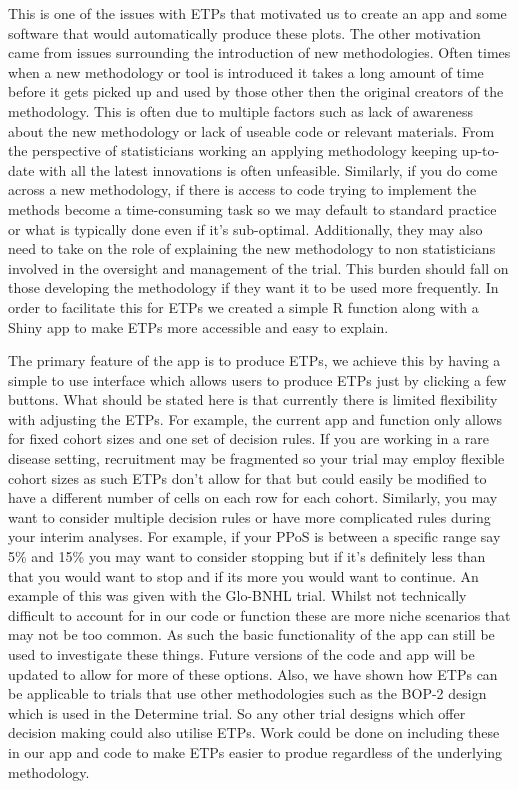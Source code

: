 This is one of the issues with ETPs that motivated us to create an app and some software that would automatically produce these plots. The other motivation came from issues surrounding the introduction of new methodologies. Often times when a new methodology or tool is introduced it takes a long amount of time before it gets picked up and used by those other then the original creators of the methodology. This is often due to multiple factors such as lack of awareness about the new methodology or lack of useable code or relevant materials. From the perspective of statisticians working an applying methodology keeping up-to-date with all the latest innovations is often unfeasible. Similarly, if you do come across a new methodology, if there is access to code trying to implement the methods become a time-consuming task so we may default to standard practice or what is typically done even if it's sub-optimal. Additionally, they may also need to take on the role of explaining the new methodology to non statisticians involved in the oversight and management of the trial. This burden should fall on those developing the methodology if they want it to be used more frequently. In order to facilitate this for ETPs we created a simple R function along with a Shiny app to make ETPs more accessible and easy to explain. 

The primary feature of the app is to produce ETPs, we achieve this by having a simple to use interface which allows users to produce ETPs just by clicking a few buttons. What should be stated here is that currently there is limited flexibility with adjusting the ETPs. For example, the current app and function only allows for fixed cohort sizes and one set of decision rules. If you are working in a rare disease setting, recruitment may be fragmented so your trial may employ flexible cohort sizes as such ETPs don't allow for that but could easily be modified to have a different number of cells on each row for each cohort. Similarly, you may want to consider multiple decision rules or have more complicated rules during your interim analyses. For example, if your PPoS is between a specific range say 5\% and 15\% you may want to consider stopping but if it's definitely less than that you would want to stop and if its more you would want to continue. An example of this was given with the Glo-BNHL trial. Whilst not technically difficult to account for in our code or function these are more niche scenarios that may not be too common. As such the basic functionality of the app can still be used to investigate these things. Future versions of the code and app will be updated to allow for more of these options. Also, we have shown how ETPs can be applicable to trials that use other methodologies such as the BOP-2 design which is used in the Determine trial. So any other trial designs which offer decision making could also utilise ETPs. Work could be done on including these in our app and code to make ETPs easier to produe regardless of the underlying methodology. 


